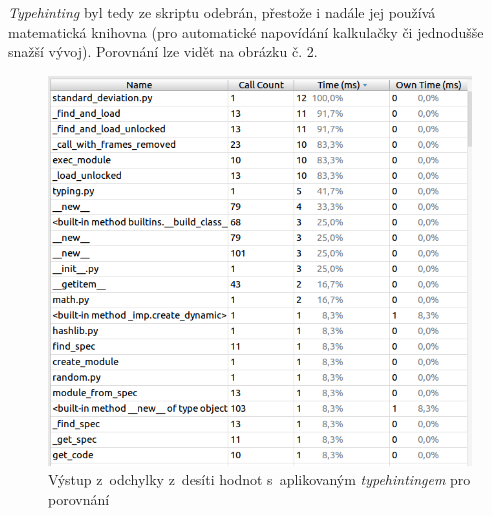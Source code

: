 \documentclass[12pt,a4paper,titlepage]{extarticle}
\begin{document}
\textit{Typehinting} byl tedy ze skriptu odebrán, přestože i nadále jej používá matematická knihovna (pro automatické
napovídání kalkulačky či jednodušše snažší vývoj). Porovnání lze vidět na obrázku č. 2.

\begin{figure}[H]
\centering
\includegraphics[width=.5\textwidth]{sd10-typehinting}
\caption{Výstup z~odchylky z~desíti hodnot s~aplikovaným \textit{typehintingem} pro porovnání}
\end{figure}
\end{document}

